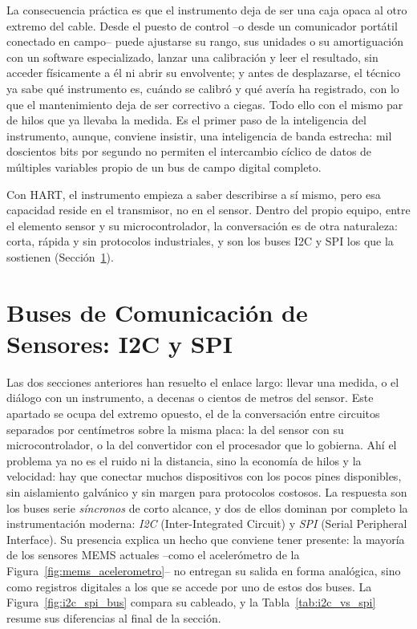 La consecuencia práctica es que el instrumento deja de ser una caja opaca al otro extremo del cable. Desde el puesto de control --o desde un comunicador portátil conectado en campo-- puede ajustarse su rango, sus unidades o su amortiguación con un software especializado, lanzar una calibración y leer el resultado, sin acceder físicamente a él ni abrir su envolvente; y antes de desplazarse, el técnico ya sabe qué instrumento es, cuándo se calibró y qué avería ha registrado, con lo que el mantenimiento deja de ser correctivo a ciegas. Todo ello con el mismo par de hilos que ya llevaba la medida. Es el primer paso de la inteligencia del instrumento, aunque, conviene insistir, una inteligencia de banda estrecha: mil doscientos bits por segundo no permiten el intercambio cíclico de datos de múltiples variables propio de un bus de campo digital completo.

Con HART, el instrumento empieza a saber describirse a sí mismo, pero esa capacidad reside en el transmisor, no en el sensor. Dentro del propio equipo, entre el elemento sensor y su microcontrolador, la conversación es de otra naturaleza: corta, rápida y sin protocolos industriales, y son los buses I2C y SPI los que la sostienen (Sección~\ref{sec:i2c_spi}).

\section{Buses de Comunicación de Sensores: I2C y SPI}\label{sec:i2c_spi}

Las dos secciones anteriores han resuelto el enlace largo: llevar una medida, o el diálogo con un instrumento, a decenas o cientos de metros del sensor. Este apartado se ocupa del extremo opuesto, el de la conversación entre circuitos separados por centímetros sobre la misma placa: la del sensor con su microcontrolador, o la del convertidor con el procesador que lo gobierna. Ahí el problema ya no es el ruido ni la distancia, sino la economía de hilos y la velocidad: hay que conectar muchos dispositivos con los pocos pines disponibles, sin aislamiento galvánico y sin margen para protocolos costosos. La respuesta son los buses serie \emph{síncronos} de corto alcance, y dos de ellos dominan por completo la instrumentación moderna: \emph{I2C} (Inter-Integrated Circuit) y \emph{SPI} (Serial Peripheral Interface). Su presencia explica un hecho que conviene tener presente: la mayoría de los sensores MEMS actuales --como el acelerómetro de la Figura~\ref{fig:mems_acelerometro}-- no entregan su salida en forma analógica, sino como registros digitales a los que se accede por uno de estos dos buses. La Figura~\ref{fig:i2c_spi_bus} compara su cableado, y la Tabla~\ref{tab:i2c_vs_spi} resume sus diferencias al final de la sección.

